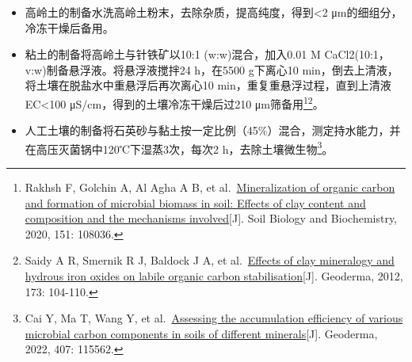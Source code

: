 \documentclass[
  letterpaper,
  DIV=11,
  numbers=noendperiod]{scrartcl}
\begin{document}
\begin{itemize}
\item
  高岭土的制备水洗高岭土粉末，去除杂质，提高纯度，得到\textless2
  μm的细组分，冷冻干燥后备用。
\item
  粘土的制备将高岭土与针铁矿以10:1 (w:w)混合，加入0.01 M
  CaCl2(10:1，v:w)制备悬浮液。将悬浮液搅拌24 h，在5500 g下离心10
  min，倒去上清液，将土壤在脱盐水中重悬浮后再次离心10
  min，重复重悬浮过程，直到上清液EC\textless100
  μS/cm，得到的土壤冷冻干燥后过210 μm筛备用\footnote{Rakhsh F, Golchin
    A, Al Agha A B, et
    al.~\href{https://doi.org/10.1016/j.soilbio.2020.108036}{Mineralization
    of organic carbon and formation of microbial biomass in soil:
    Effects of clay content and composition and the mechanisms
    involved}{[}J{]}. Soil Biology and Biochemistry, 2020, 151: 108036.}\footnote{Saidy
    A R, Smernik R J, Baldock J A, et
    al.~\href{https://doi.org/10.1016/j.geoderma.2011.12.030}{Effects of
    clay mineralogy and hydrous iron oxides on labile organic carbon
    stabilisation}{[}J{]}. Geoderma, 2012, 173: 104-110.}。
\item
  人工土壤的制备将石英砂与黏土按一定比例（45\%）混合，测定持水能力，并在高压灭菌锅中120℃下湿蒸3次，每次2
  h，去除土壤微生物\footnote{Cai Y, Ma T, Wang Y, et
    al.~\href{https://doi.org/10.1016/j.geoderma.2021.115562}{Assessing
    the accumulation efficiency of various microbial carbon components
    in soils of different minerals}{[}J{]}. Geoderma, 2022, 407: 115562.}。
\end{itemize}


\printbibliography[title=参考资料]
\end{document}
